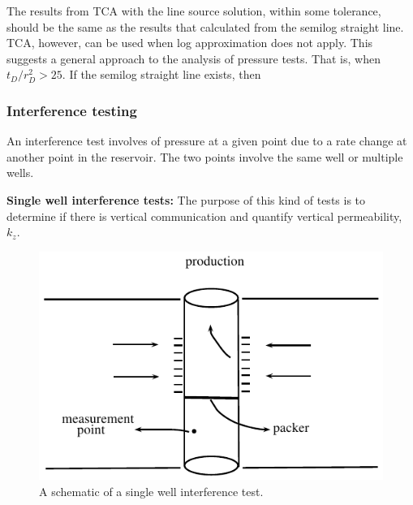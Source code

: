 \documentclass{llncs}
\numberwithin{equation}{section}
\numberwithin{figure}{section}
\numberwithin{table}{section}
\begin{document}
    The results from TCA with the line source solution, within some tolerance, should be the same as the results that  calculated from the semilog straight line. TCA, however, can  be used when log approximation does not apply. This suggests a general approach to the analysis of pressure tests.  That is,  when $t_{D}/r_{D}^{2}>25$.  If the semilog straight line exists, then 

    \subsubsection{Interference testing}

    An interference test involves  of pressure at a given point due to a rate change at another point in the reservoir. The two points involve the same well or multiple wells.

    \textbf{Single well interference tests:}
    The purpose of this kind of tests is to determine if there is vertical communication and quantify  vertical permeability, $k_{z}$.

    \begin{figure}
        \begin{center}
        \includegraphics[scale=1]{Interference_test.pdf}
        \end{center}
        \caption{A schematic of a single well interference test.}
        \label{Interference_test}
    \end{figure}
\end{document}
